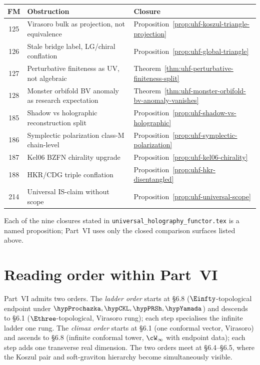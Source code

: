 \begin{center}
\begin{tabular}{c|p{5.5cm}|p{6.5cm}}
\hline
\textbf{FM} & \textbf{Obstruction} & \textbf{Closure} \\
\hline
125 & Virasoro bulk as projection, not equivalence & Proposition~\ref{prop:uhf-koszul-triangle-projection} \\
126 & Stale bridge label, LG/chiral conflation
 & Proposition~\ref{prop:uhf-global-triangle} \\
127 & Perturbative finiteness as UV, not algebraic
 & Theorem~\ref{thm:uhf-perturbative-finiteness-split} \\
128 & Monster orbifold BV anomaly as research expectation
 & Theorem~\ref{thm:uhf-monster-orbifold-bv-anomaly-vanishes} \\
185 & Shadow vs holographic reconstruction split
 & Proposition~\ref{prop:uhf-shadow-vs-holographic} \\
186 & Symplectic polarization class-M chain-level
 & Proposition~\ref{prop:uhf-symplectic-polarization} \\
187 & Kel06 BZFN chirality upgrade
 & Proposition~\ref{prop:uhf-kel06-chirality} \\
188 & HKR/CDG triple conflation
 & Proposition~\ref{prop:uhf-hkr-disentangled} \\
214 & Universal IS-claim without scope
 & Proposition~\ref{prop:uhf-universal-scope} \\
\hline
\end{tabular}
\end{center}

Each of the nine closures stated in
\texttt{universal\_holography\_functor.tex} is a named proposition;
Part~VI uses only the closed comparison surfaces listed above.

\section{Reading order within Part~VI}
\label{sec:part-vi-reading-order}

Part~VI admits two orders. The \emph{ladder order} starts at \S6.8
($\Einfty$-topological endpoint under
\(\hypProchazka,\hypCKL,\hypPRSh,\hypYamada\)) and descends to \S6.1
($\Ethree$-topological, Virasoro rung); each step specialises the
infinite ladder one rung. The \emph{climax order} starts at \S6.1
(one conformal vector, Virasoro) and ascends to \S6.8 (infinite
conformal tower, $\cW_\infty$ with endpoint data); each step adds one
transverse real dimension. The two orders meet at \S6.4--\S6.5, where
the Koszul pair and soft-graviton hierarchy become simultaneously
visible.

